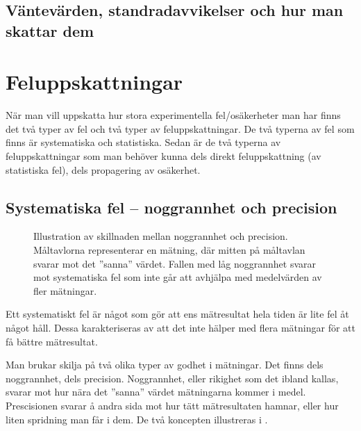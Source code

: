 \documentclass[11pt,a4paper, english, swedish
]{article}
\begin{document}
\subsection{Väntevärden, standradavvikelser och hur man skattar dem}








\section{Feluppskattningar}\label{sec:feluppskattningar}
När man vill uppskatta hur stora experimentella fel/osäkerheter man
har finns det två typer av fel och två typer av feluppskattningar. De
två typerna av fel som finns är systematiska och statistiska. Sedan är
de två typerna av feluppskattningar som man behöver kunna dels direkt
feluppskattning (av statistiska fel), dels propagering av osäkerhet. 


\subsection{Systematiska fel -- noggrannhet och precision}
\begin{figure}
\centering

\caption{Illustration av skillnaden mellan noggrannhet och
  precision. Måltavlorna representerar en mätning, där mitten på
  måltavlan svarar mot det ''sanna'' värdet. Fallen med låg
  noggrannhet svarar mot systematiska fel som inte går att avhjälpa
  med medelvärden av fler mätningar.}
\label{fig:prec_nog}
\end{figure}

Ett systematiskt fel är något som gör att ens mätresultat hela tiden
är lite fel åt något håll\footnotemark{}. Dessa karakteriseras av att
det inte hälper med flera mätningar för att få bättre mätresultat.


Man brukar skilja på två olika typer av godhet i mätningar. Det finns
dels noggrannhet, dels precision. Noggrannhet, eller rikighet som det
ibland kallas, svarar mot hur nära det ''sanna'' värdet mätningarna
kommer i medel. Prescisionen svarar å andra sida mot hur tätt
mätresultaten hamnar, eller hur liten spridning man får i dem. De två
koncepten illustreras i .  
\end{document}

